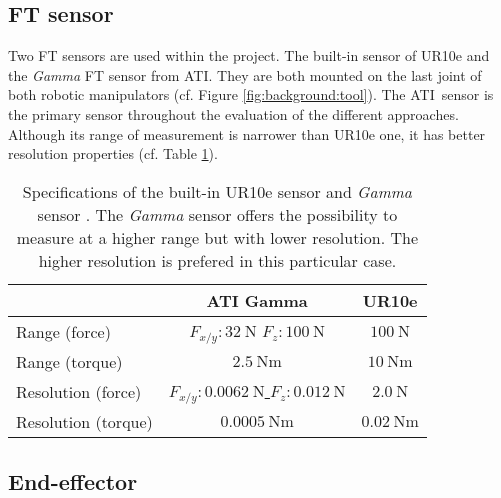 \documentclass[/home/francois/latex/report/main.tex]{subfiles}
\begin{document}
\subsection{\ac{FT} sensor}

Two \ac{FT} sensors are used within the project. The built-in sensor of UR10e and the \textit{Gamma} \ac{FT} sensor from ATI\texttrademark. They are both mounted on the last joint of both robotic manipulators (cf. Figure \ref{fig:background:tool}). The ATI\texttrademark \ sensor is the primary sensor throughout the evaluation of the different approaches. Although its range of measurement is narrower than UR10e one, it has better resolution properties (cf. Table \ref{tab:background:ft-sensor}).

\begin{table}[h]
  \begin{center}
    \renewcommand{\arraystretch}{1.8} %
    \begin{tabular}{l|c|c} %
      & \textbf{ATI Gamma} & \textbf{UR10e}\\
      \hline
      Range (force)  & $F_{x/y}: 32 \ \si{\newton}$ $F_z: 100 \ \si{\newton}$ & \underline{$100 \ \si{\newton}$} \\
      \hline
      Range (torque)  & $2.5 \ \si{\newton} \si{\meter}$ & \underline{$10 \ \si{\newton} \si{\meter}$} \\
      \hline
      Resolution (force)  & \underline{$F_{x/y}: 0.0062 \ \si{\newton}$ $F_z: 0.012 \ \si{\newton}$} & $2.0 \ \si{\newton}$ \\
      \hline
      Resolution (torque)  & \underline{$0.0005 \ \si{\newton} \si{\meter}$} & $0.02 \ \si{\newton} \si{\meter}$ \\
      \hline
    \end{tabular}
  \end{center}
  \caption{Specifications of the built-in UR10e sensor and \textit{Gamma} sensor \cite{ati, ur10e}. The \textit{Gamma} sensor offers the possibility to measure at a higher range but with lower resolution. The higher resolution is prefered in this particular case.\label{tab:background:ft-sensor}}
\end{table}

\subsection{End-effector}
\end{document}
